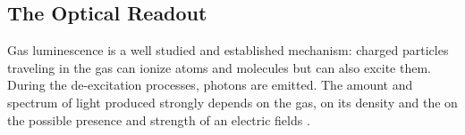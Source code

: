 \documentclass[physics,article,submit,moreauthors,pdftex]{Definitions/mdpi}
\begin{document}





\subsection{The Optical Readout}
\label{sect:opro}

Gas luminescence is a well studied and established mechanism: charged particles traveling in the gas can ionize atoms and molecules but can also excite them. During the de-excitation processes, photons are emitted. The amount and spectrum of light produced strongly depends on the gas, on its density and the on the possible presence and strength of an electric fields \cite{bib:Fraga, bib:Margato2, bib:lumi, bib:monte}.
\end{document}
